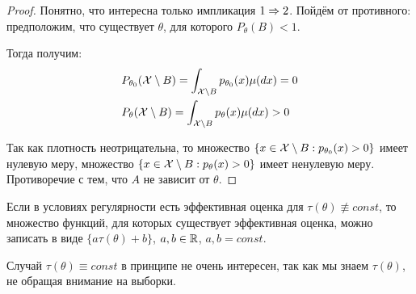 \begin{proof}
    Понятно, что интересна только импликация $1 \Rightarrow 2$. Пойдём от противного: предположим, что существует $\theta$, для которого $P_\theta(B) < 1$.

    Тогда получим:
    \begin{align*}
        & P_{\theta_0}(\mathcal{X} \setminus B) = \int_{\mathcal{X} \setminus B} p_{\theta_0}(x) \mu(dx) = 0
        \\
        & P_\theta(\mathcal{X} \setminus B) = \int_{\mathcal{X} \setminus B} p_\theta(x) \mu(dx) > 0
    \end{align*}

    Так как плотность неотрицательна, то множество $\{x \in \mathcal{X} \setminus B : p_{\theta_0}(x) > 0\}$ имеет нулевую меру, множество $\{x \in \mathcal{X} \setminus B : p_\theta(x) > 0\}$ имеет ненулевую меру. Противоречие с тем, что $A$ не зависит от $\theta$.
\end{proof}

\begin{theorem}
    Если в условиях регулярности есть эффективная оценка для $\tau(\theta) \not\equiv const$, то множество функций, для которых существует эффективная оценка, можно записать в виде $\{a \tau(\theta) + b\}$, $a, b \in \mathbb{R}$, $a, b = const$.
\end{theorem}

\begin{note}
    Случай $\tau(\theta) \equiv const$ в принципе не очень интересен, так как мы знаем $\tau(\theta)$, не обращая внимание на выборки.
\end{note}

